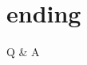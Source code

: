 \documentclass{beamer}
\begin{document}
\section*{ending}
\begin{frame}
    \begin{center}
        \huge Q \& A
    \end{center}
\end{frame}







\end{document}
